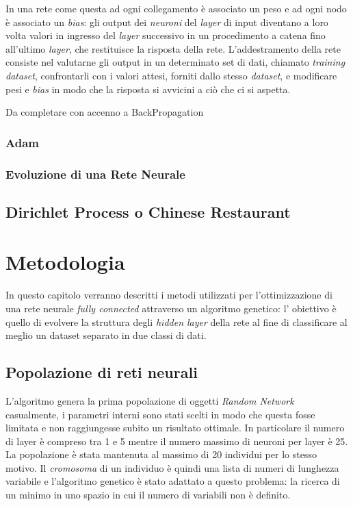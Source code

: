 \documentclass[12pt,a4paper]{report}
\begin{document}
In una rete come questa ad ogni collegamento è associato un peso e ad ogni nodo è associato un \textit{bias}: gli output dei \textit{neuroni} del \textit{layer} di input diventano a loro volta valori in ingresso del \textit{layer} successivo in un procedimento a catena fino all'ultimo \textit{layer}, che restituisce la risposta della rete. 
L'addestramento della rete consiste nel valutarne gli output in un determinato set di dati, chiamato \textit{training dataset}, confrontarli con i valori attesi, forniti dallo stesso \textit{dataset}, e modificare pesi e \textit{bias} in modo che la risposta si avvicini a ciò che ci si aspetta.


Da completare con accenno a BackPropagation

\subsection{Adam}

\subsection{Evoluzione di una Rete Neurale}

\section{Dirichlet Process o Chinese Restaurant }

\chapter{Metodologia}

In questo capitolo verranno descritti i metodi utilizzati per l'ottimizzazione di una rete neurale \textit{fully connected} attraverso un algoritmo genetico: l' obiettivo è quello di evolvere la struttura degli \textit{hidden layer} della rete al fine di classificare al meglio 
un dataset separato in due classi di dati.

\section{Popolazione di reti neurali}

L'algoritmo genera la prima popolazione di oggetti \textit{Random Network} casualmente, i parametri interni sono stati scelti in modo che questa fosse limitata e non raggiungesse subito un risultato ottimale.
In particolare il numero di layer è compreso tra 1 e 5 mentre il numero massimo di neuroni per layer è 25.
La popolazione è stata mantenuta al massimo di 20 individui per lo stesso motivo.
Il \textit{cromosoma} di un individuo è quindi una lista di numeri di lunghezza variabile e l'algoritmo genetico è stato adattato a questo problema: la ricerca di un minimo in uno spazio in cui il numero di variabili non è definito.
\end{document}
